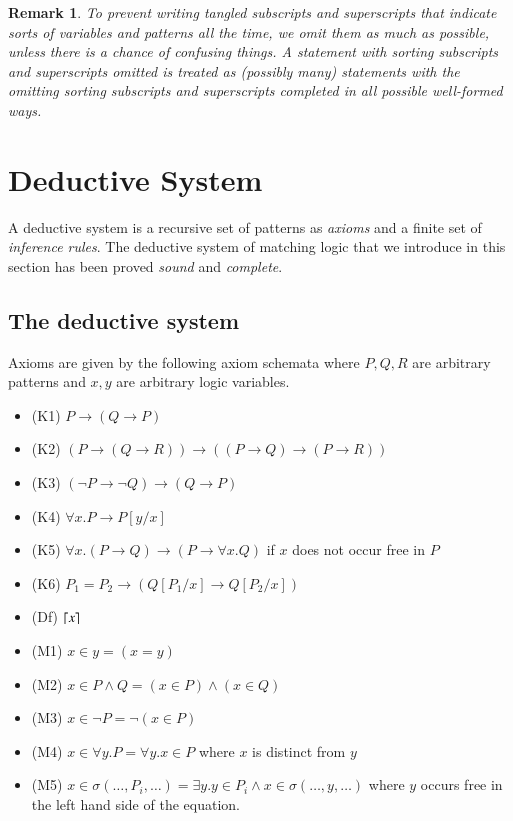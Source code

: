 \documentclass{article}
\theoremstyle{plain}
\newtheorem{rmk}[thm]{Remark}
\DeclarePairedDelimiter\ceil{\lceil}{\rceil}
\def\imp{\rightarrow}
\begin{document}
\begin{rmk}
	To prevent writing tangled subscripts and superscripts that indicate sorts of variables and patterns all the time, we omit them as much as possible, unless there is a chance of confusing things. A statement with sorting subscripts and superscripts omitted is treated as (possibly many) statements with the omitting sorting subscripts and superscripts completed in all possible well-formed ways.
\end{rmk}

\section{Deductive System}
A deductive system is a recursive set of patterns as \emph{axioms} and a finite set of \emph{inference rules}. The deductive system of matching logic that we introduce in this section has been proved \emph{sound} and \emph{complete}.

\subsection{The deductive system}

Axioms are given by the following axiom schemata where $P, Q, R$ are arbitrary patterns and $x, y$ are arbitrary logic variables.
\begin{itemize}
\item (K1) $P \imp (Q \imp P)$
\item (K2) $(P \imp (Q \imp R)) \imp ((P \imp Q) \imp (P \imp R))$
\item (K3) $(\neg P \imp \neg Q) \imp (Q \imp P)$
\item (K4) $\forall x . P \imp P[y/x]$
\item (K5) $\forall x . (P \imp Q) \imp (P \imp \forall x . Q)$ if $x$ does not occur free in $P$
\item (K6) $P_1 = P_2 \imp (Q[P_1/x] \imp Q[P_2/x])$
\item (Df)  $\ceil{x}$
\item (M1) $x \in y = (x = y)$
\item (M2) $x \in P \wedge Q = (x \in P) \wedge (x \in Q)$
\item (M3) $x \in \neg P = \neg (x \in P)$
\item (M4) $x \in \forall y . P = \forall y . x \in P$ where $x$ is distinct from $y$
\item (M5) $x \in \sigma(\dots,P_i,\dots) = \exists y . y \in P_i \wedge x \in \sigma(\dots,y,\dots)$ where $y$ occurs free in the left hand side of the equation.
\end{itemize}
\end{document}
